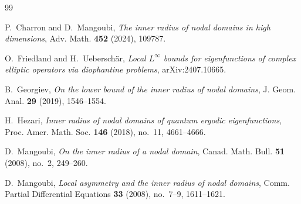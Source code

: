 \documentclass[12pt, reqno]{amsart}
\theoremstyle{plain}
\theoremstyle{remark}
\begin{document}
\begin{thebibliography}{99}

P.~Charron and D.~Mangoubi,
\emph{The inner radius of nodal domains in high dimensions},
Adv. Math. \textbf{452} (2024), 109787.

O.~Friedland and H.~Uebersch\"ar,
\emph{Local $L^\infty$ bounds for eigenfunctions of complex elliptic operators via diophantine problems},
arXiv:2407.10665.

B.~Georgiev,
\emph{On the lower bound of the inner radius of nodal domains},
J. Geom. Anal. \textbf{29} (2019), 1546--1554.

H.~Hezari,
\emph{Inner radius of nodal domains of quantum ergodic eigenfunctions},
Proc. Amer. Math. Soc. \textbf{146} (2018), no.~11, 4661--4666.

D.~Mangoubi,
\emph{On the inner radius of a nodal domain},
Canad. Math. Bull. \textbf{51} (2008), no.~2, 249--260.

D.~Mangoubi,
\emph{Local asymmetry and the inner radius of nodal domains},
Comm. Partial Differential Equations \textbf{33} (2008), no.~7--9, 1611--1621.


\end{thebibliography}
\end{document}
